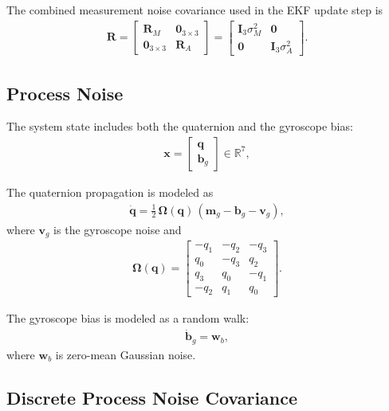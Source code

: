 \documentclass[10pt,a4paper]{article}
\begin{document}
The combined measurement noise covariance used in the EKF update step is
\begin{align}
  \mathbf{R} =
  \begin{bmatrix}
    \mathbf{R}_M & \mathbf{0}_{3\times3} \\
    \mathbf{0}_{3\times3} & \mathbf{R}_A
  \end{bmatrix}
  =
  \begin{bmatrix}
    \mathbf{I}_3 \sigma_M^2 & \mathbf{0} \\
    \mathbf{0} & \mathbf{I}_3 \sigma_A^2
  \end{bmatrix}.
\end{align}

\subsection{Process Noise}

The system state includes both the quaternion and the gyroscope bias:
\begin{align}
  \mathbf{x} =
  \begin{bmatrix}
    \mathbf{q} \\[1mm]
    \mathbf{b}_g
  \end{bmatrix} \in \mathbb{R}^7,
\end{align}

The quaternion propagation is modeled as
\begin{align}
  \dot{\mathbf{q}} = \frac{1}{2} \, \boldsymbol{\Omega}(\mathbf{q}) \, (\mathbf{m}_g - \mathbf{b}_g - \mathbf{v}_g),
\end{align}
where $\mathbf{v}_g$ is the gyroscope noise and
\begin{align}
  \boldsymbol{\Omega}(\mathbf{q}) =
  \begin{bmatrix}
   -q_1 & -q_2 & -q_3 \\
    q_0 & -q_3 &  q_2 \\
    q_3 &  q_0 & -q_1 \\
   -q_2 &  q_1 &  q_0
  \end{bmatrix}.
\end{align}

The gyroscope bias is modeled as a random walk:
\begin{align}
  \dot{\mathbf{b}}_g = \mathbf{w}_b,
\end{align}
where $\mathbf{w}_b$ is zero-mean Gaussian noise.

\subsection{Discrete Process Noise Covariance}
\end{document}
